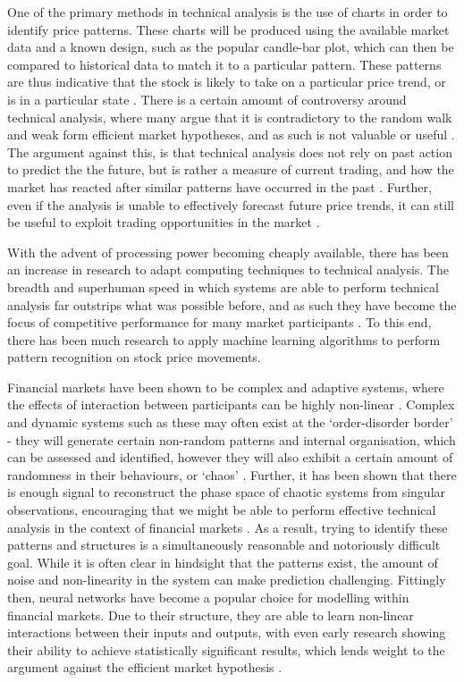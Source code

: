 \documentclass[a4paper,11pt,oneside]{article}
\theoremstyle{plain}
\theoremstyle{definition}
\begin{document}
	One of the primary methods in technical analysis is the use of charts in order to identify price patterns. 
	These charts will be produced using the available market data and a known design, such as the popular candle-bar 
	plot, which can then be compared to historical data to match it to a particular pattern. These patterns are thus 
	indicative that the stock is likely to take on a particular price trend, or is in a particular state \citep{Murphy, LoHeretics}.  
	There is a certain amount of controversy around technical analysis, where many argue that it is contradictory 
	to the random walk and weak form efficient market hypotheses, and as such is not valuable or useful \citep{Griffioen}. 
	The argument against this, is that technical analysis does not rely on past action to predict the the future, but is 
	rather a measure of current trading, and how the market has reacted after similar patterns have occurred in the 
	past \citep{Kahn}. Further, even if the analysis is unable to effectively forecast future price trends, it can still be useful 
	to exploit trading opportunities in the market \citep{Schwager}.
	\hfill \break 
	
	With the advent of processing power becoming cheaply available, there has been an increase in research to 
	adapt computing techniques to technical analysis. The breadth and superhuman speed in which systems are 
	able to perform technical analysis far outstrips what was possible before, and as such they have become the 
	focus of competitive performance for many market participants \citep{Johnson}. To this end, there has been much 
	research to apply machine learning algorithms to perform pattern recognition on stock price movements.
	\hfill \break
	
	Financial markets have been shown to be complex and adaptive systems, where the effects of interaction 
	between participants can be highly non-linear \citep{Arthur}. Complex and dynamic systems such as these may 
	often exist at the `order-disorder border' - they will generate certain non-random patterns and internal organisation, 
	which can be assessed and identified, however they will also exhibit a certain amount of randomness in their behaviours, 
	or `chaos' \citep{Crutchfield}. Further, it has been shown that there is enough signal to reconstruct 
	the phase space of chaotic systems from singular observations, encouraging that we might be able to perform 
	effective technical analysis in the context of financial markets \citep{Packard, Takens}. As a result, trying to identify these patterns and structures is a simultaneously 
	reasonable and notoriously difficult goal. While it is often clear in hindsight that the patterns exist, the amount of 
	noise and non-linearity in the system can make prediction challenging.
	Fittingly then, neural networks have become a popular choice for modelling within financial markets. Due to 
	their structure, they are able to learn non-linear interactions between their inputs and outputs, with even early research 
	showing their ability to achieve statistically significant results, which lends weight to the 
	argument against the efficient market hypothesis \citep{Skabar}. 
	\hfill \break
	
\end{document}
